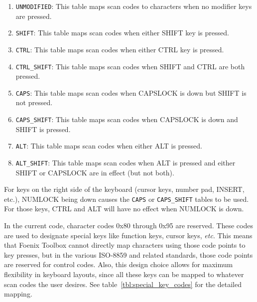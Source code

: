 
\begin{enumerate}
    \item \verb+UNMODIFIED+: This table maps scan codes to characters when no modifier keys are pressed.
    \item \verb+SHIFT+: This table maps scan codes when either SHIFT key is pressed.
    \item \verb+CTRL+: This table maps scan codes when either CTRL key is pressed.
    \item \verb+CTRL_SHIFT+: This table maps scan codes when SHIFT and CTRL are both pressed.
    \item \verb+CAPS+: This table maps scan codes when CAPSLOCK is down but SHIFT is not pressed.
    \item \verb+CAPS_SHIFT+: This table maps scan codes when CAPSLOCK is down and SHIFT is pressed.
    \item \verb+ALT+: This table maps scan codes when either ALT is pressed.
    \item \verb+ALT_SHIFT+: This table maps scan codes when ALT is pressed and either SHIFT or CAPSLOCK are in effect (but not both).
\end{enumerate}

For keys on the right side of the keyboard (cursor keys, number pad, INSERT, etc.), NUMLOCK being down causes the \verb+CAPS+ or \verb+CAPS_SHIFT+ tables to be used. For those keys, CTRL and ALT will have no effect when NUMLOCK is down.

In the current code, character codes 0x80 through 0x95 are reserved. These codes are used to designate special keys like function keys, cursor keys, {\it etc}. This means that Foenix Toolbox cannot directly map characters using those code points to key presses, but in the various ISO-8859 and related standards, those code points are reserved for control codes. Also, this design choice allows for maximum flexibility in keyboard layouts, since all these keys can be mapped to whatever scan codes the user desires. See table~\ref{tbl:special_key_codes} for the detailed mapping.


